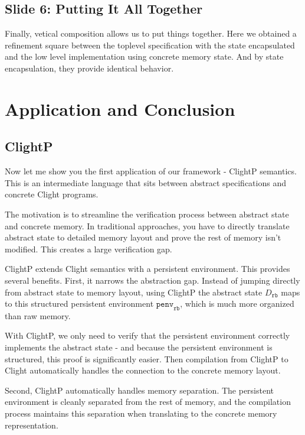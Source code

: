 \documentclass{article}
\newcommand{\kw}[1]{\ensuremath{\mathtt{#1}}}
\begin{document}
\subsection{Slide 6: Putting It All Together}

Finally, vetical composition allows us to put things together. Here we obtained
a refinement square between the toplevel specification with the state
encapsulated and the low level implementation using concrete memory state. And
by state encapsulation, they provide identical behavior.

\section{Application and Conclusion}

\subsection{ClightP}

Now let me show you the first application of our framework - ClightP semantics.
This is an intermediate language that sits between abstract specifications and
concrete Clight programs.

The motivation is to streamline the verification process between abstract state
and concrete memory. In traditional approaches, you have to directly translate
abstract state to detailed memory layout and prove the rest of memory isn't
modified. This creates a large verification gap.

ClightP extends Clight semantics with a persistent environment. This provides
several benefits. First, it narrows the abstraction gap. Instead of jumping
directly from abstract state to memory layout, using ClightP the abstract state
$D_\kw{rb}$ maps to this structured persistent environment $\kw{penv}_\kw{rb}$,
which is much more organized than raw memory.

With ClightP, we only need to verify that the persistent environment correctly
implements the abstract state - and because the persistent environment is
structured, this proof is significantly easier. Then compilation from ClightP to
Clight automatically handles the connection to the concrete memory layout.

Second, ClightP automatically handles memory separation. The persistent
environment is cleanly separated from the rest of memory, and the compilation
process maintains this separation when translating to the concrete memory
representation.
\end{document}
